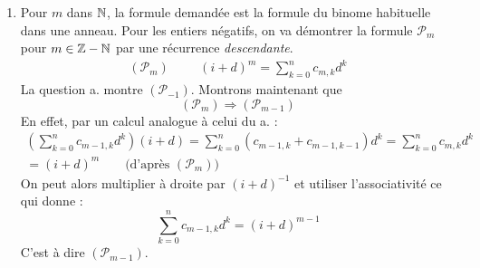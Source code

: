 \begin{enumerate}
\begin{enumerate}
\item Pour $m$ dans $\mathbb{N}$, la formule demandée est la formule du binome habituelle dans une anneau. Pour les entiers négatifs, on va démontrer la formule $\mathcal P_m$ pour $m\in \mathbb{Z} -\mathbb{N}$ par une récurrence \emph{descendante}.
\begin{align*}
 (\mathcal P_m) \hspace{1cm}  (i+d)^{m}= \sum _{k=0}^{n}c_{m,k}d^k
\end{align*}
La question a. montre $(\mathcal P_{-1})$. Montrons maintenant que
\begin{displaymath}
 (\mathcal P_m) \Rightarrow (\mathcal P_{m-1})
\end{displaymath}
En effet, par un calcul analogue à celui du a. :
\begin{multline*}
 \left( \sum _{k=0}^{n}c_{m-1,k}d^k \right) (i+d)
= \sum _{k=0}^{n}\left( c_{m-1,k}+c_{m-1,k-1}\right) d^k
= \sum _{k=0}^{n}c_{m,k}d^k \\
=(i+d)^m \hspace{20pt}\text{ (d'après $(\mathcal P_m)$)}
\end{multline*}
On peut alors multiplier à droite par $(i+d)^{-1}$ et utiliser l'associativité ce qui donne :
\begin{displaymath}
  \sum _{k=0}^{n}c_{m-1,k}d^k  = (i+d)^{m-1}
\end{displaymath}
C'est à dire $(\mathcal P_{m-1})$.
\end{enumerate}

\end{enumerate}

